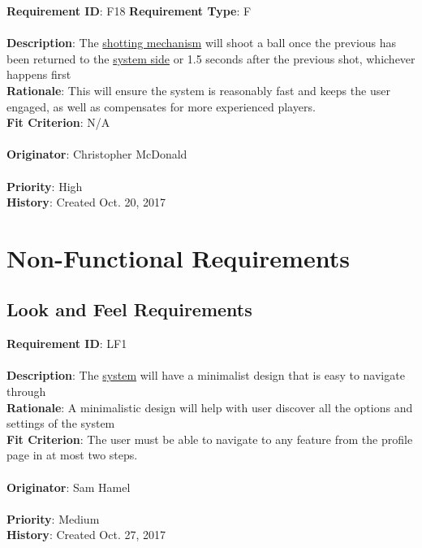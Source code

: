 \documentclass[11pt]{article}
\begin{document}
\begin{framed}
	\noindent\textbf{Requirement ID}: F18 \hfill \textbf{Requirement Type}: F \hfill\\\\
	\noindent\textbf{Description}: The \hyperref[sec:definitions]{shotting mechanism} will shoot a ball once the previous has been returned to the \hyperref[sec:definitions]{system side} or 1.5 seconds after the previous shot, whichever happens first\\
	\textbf{Rationale}: This will ensure the system is reasonably fast and keeps the user engaged, as well as compensates for more experienced players. \\
	\textbf{Fit Criterion}: N/A \\\\
	\textbf{Originator}: Christopher McDonald \\\\
	\textbf{Priority}: High \hfill \\
	\noindent\textbf{History}: Created Oct. 20, 2017
\end{framed}

\section{Non-Functional Requirements}

\subsection{Look and Feel Requirements}
\begin{framed}
	\noindent\textbf{Requirement ID}: LF1 \hfill\\\\
	\noindent\textbf{Description}: The \hyperref[sec:definitions]{system} will have a minimalist design that is easy to navigate through \\
	\textbf{Rationale}: A minimalistic design will help with user discover all the options and settings of the system  \\
	\textbf{Fit Criterion}: The user must be able to navigate to any feature from the profile page in at most two steps.  \\\\
	\textbf{Originator}: Sam Hamel \\\\
	\textbf{Priority}: Medium \hfill \\
	\noindent\textbf{History}: Created Oct. 27, 2017
\end{framed}
\end{document}
